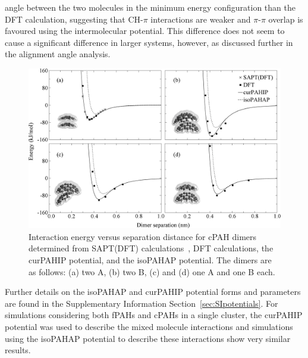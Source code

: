 angle between the two molecules in the minimum energy configuration than the DFT calculation, suggesting that CH-$\pi$ interactions are weaker and $\pi$-$\pi$ overlap is favoured using the intermolecular potential.  This difference does not seem to cause a significant difference in larger systems, however, as discussed further in the alignment angle analysis. 
%
\begin{figure}[!tbh]
\centering
\includegraphics[width=1\linewidth]{Figures/potentialDFT_curves.eps}
\caption{Interaction energy versus separation distance for cPAH dimers determined from SAPT(DFT) calculations~\cite{Cabaleiro-Lago2018}, DFT calculations, the curPAHIP potential, and the isoPAHAP potential. The dimers are as follows: (a) two A, (b) two B, (c) and (d) one A and one B each.}
\label{fig:potentialDFTcurves}
\end{figure}
%

Further details on the isoPAHAP and curPAHIP potential forms and parameters are found in the Supplementary Information Section~\ref{sec:SIpotentials}. For simulations considering both fPAHs and cPAHs in a single cluster, the curPAHIP potential was used to describe the mixed molecule interactions and simulations using the isoPAHAP potential to describe these interactions show very similar results.


